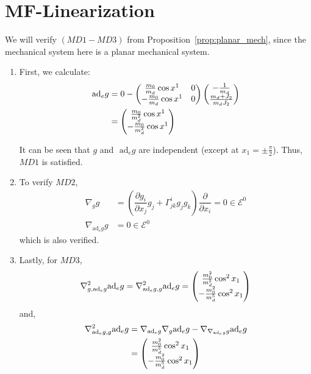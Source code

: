 \section{MF-Linearization}

We will verify $(MD1 - MD3)$ from Proposition~\ref{prop:planar_mech}, since the mechanical system here is a planar mechanical system.

\begin{enumerate}
    \item First, we calculate:
    \begin{equation}
    \begin{split}
        \text{ad}_e g & = 0 - \begin{pmatrix}
        \frac{m_0}{m_d} \cos{x^1} & 0 \\
        - \frac{m_0}{m_d} \cos{x^1} & 0
        \end{pmatrix}
        \begin{pmatrix}
        -\frac{1}{m_d} \\
        \frac{m_d + J_2}{m_d J_2}
        \end{pmatrix} \\
        & = 
        \begin{pmatrix}
        \frac{m_0}{m_d^2}\cos{x^1} \\
        -\frac{m_0}{m_d^2}\cos{x^1}
        \end{pmatrix}
    \end{split}
    \end{equation}
    
    It can be seen that $g$ and $\text{ ad}_e g$ are independent (except at $x_1 = \pm \frac{\pi}{2}$). Thus, $MD1$ is satisfied.
    \item To verify $MD2$,
    \begin{equation}
        \begin{split}
            \nabla_g g & = \left(\dfrac{\partial g_i}{\partial x_j}g_j + \Gamma^i_{jk}g_j g_k \right) \dfrac{\partial}{\partial x_i} = 0 \in \mathcal{E}^0 \\
            \nabla_{\text{ad}_e g} g & = 0 \in \mathcal{E}^0
        \end{split}
    \end{equation}
    which is also verified. 
    \item Lastly, for $MD3$,
    \begin{equation}
    \label{eq:md3-1}
        \begin{split}
            \nabla^2_{g, \text{ad}_e g} \text{ad}_e g = \nabla^2_{\text{ad}_e g, g} \text{ad}_e g = \begin{pmatrix}
            \frac{m_0^2}{m_d^5}\cos^2{x_1} \\
            - \frac{m_0^2}{m_d^5} \cos^2{x_1}
            \end{pmatrix}
        \end{split}
    \end{equation}
    and,
    \begin{equation}
    \label{eq:md3-2}
        \begin{split}
            \nabla^2_{\text{ad}_e g, g} \text{ad}_e g & = \nabla_{\text{ad}_e g} \nabla_g \text{ad}_e g - \nabla_{\nabla_{\text{ad}_e g} g} \text{ad}_e g \\
            & = \begin{pmatrix}
            \frac{m_0^2}{m_d^5}\cos^2{x_1} \\
            - \frac{m_0^2}{m_d^5} \cos^2{x_1}
            \end{pmatrix}
        \end{split}
    \end{equation}
    
\end{enumerate}
 
